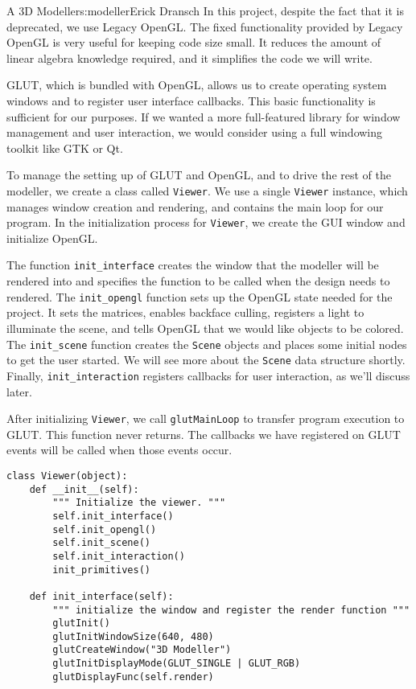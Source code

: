 \begin{aosachapter}{A 3D Modeller}{s:modeller}{Erick Dransch}
In this project, despite the fact that it is deprecated, we use Legacy
OpenGL. The fixed functionality provided by Legacy OpenGL is very useful
for keeping code size small. It reduces the amount of linear algebra
knowledge required, and it simplifies the code we will write.

\label{about-glut}

GLUT, which is bundled with OpenGL, allows us to create operating system
windows and to register user interface callbacks. This basic
functionality is sufficient for our purposes. If we wanted a more
full-featured library for window management and user interaction, we
would consider using a full windowing toolkit like GTK or Qt.

\label{the-viewer}

To manage the setting up of GLUT and OpenGL, and to drive the rest of
the modeller, we create a class called \texttt{Viewer}. We use a single
\texttt{Viewer} instance, which manages window creation and rendering,
and contains the main loop for our program. In the initialization
process for \texttt{Viewer}, we create the GUI window and initialize
OpenGL.

The function \texttt{init\_interface} creates the window that the
modeller will be rendered into and specifies the function to be called
when the design needs to rendered. The \texttt{init\_opengl} function
sets up the OpenGL state needed for the project. It sets the matrices,
enables backface culling, registers a light to illuminate the scene, and
tells OpenGL that we would like objects to be colored. The
\texttt{init\_scene} function creates the \texttt{Scene} objects and
places some initial nodes to get the user started. We will see more
about the \texttt{Scene} data structure shortly. Finally,
\texttt{init\_interaction} registers callbacks for user interaction, as
we'll discuss later.

After initializing \texttt{Viewer}, we call \texttt{glutMainLoop} to
transfer program execution to GLUT. This function never returns. The
callbacks we have registered on GLUT events will be called when those
events occur.

\begin{verbatim}
class Viewer(object):
    def __init__(self):
        """ Initialize the viewer. """
        self.init_interface()
        self.init_opengl()
        self.init_scene()
        self.init_interaction()
        init_primitives()

    def init_interface(self):
        """ initialize the window and register the render function """
        glutInit()
        glutInitWindowSize(640, 480)
        glutCreateWindow("3D Modeller")
        glutInitDisplayMode(GLUT_SINGLE | GLUT_RGB)
        glutDisplayFunc(self.render)


\end{verbatim}
\end{aosachapter}
